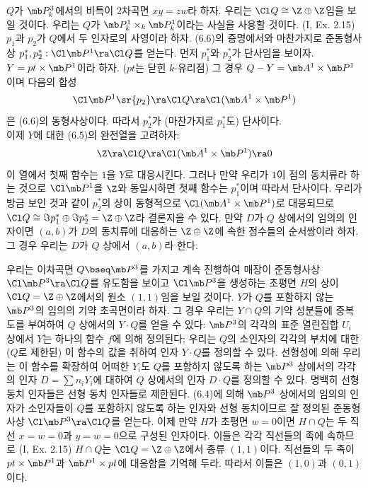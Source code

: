 	
	\begin{example}
	$Q$가 $\mb P^3_k$에서의 비특이 2차곡면 $xy=zw$라 하자. 우리는 $\Cl Q\cong\Z\oplus\Z$임을 보일 것이다.
	우리는 $Q$가 $\mb P_k^1\times_k\mb P_k^1$이라는 사실을 사용할 것이다. (I, Ex. 2.15)
	$p_1$과 $p_2$가 $Q$에서 두 인자로의 사영이라 하자.
	(6.6)의 증명에서와 마찬가지로 준동형사상 $p_1^*,p_2^*:\Cl\mb P^1\ra\Cl Q$를 얻는다.
	먼저 $p_1^*$와 $p_2^*$가 단사임을 보이자. $Y=pt\times\mb P^1$이라 하자. ($pt$는 닫힌 $k$-유리점)
	그 경우 $Q-Y=\mb A^1\times\mb P^1$이며 다음의 합성
	$$\Cl\mb P^1\sr{p_2}\ra\Cl Q\ra\Cl(\mb A^1\times\mb P^1)$$
	은 (6.6)의 동형사상이다. 따라서 $p_2^*$가 (마찬가지로 $p_1^*$도) 단사이다.\\
	이제 $Y$에 대한 (6.5)의 완전열을 고려하자:
	$$\Z\ra\Cl Q\ra\Cl(\mb A^1\times\mb P^1)\ra 0$$
	이 열에서 첫째 함수는 $1$을 $Y$로 대응시킨다.
	그러나 만약 우리가 $1$이 점의 동치류라 하는 것으로 $\Cl\mb P^1$을 $\Z$와 동일시하면 첫째 함수는 $p_1^*$이며 따라서 단사이다.
	우리가 방금 보인 것과 같이 $p_2^*$의 상이 동형적으로 $\Cl(\mb A^1\times\mb P^1)$로 대응되므로
	$\Cl Q\cong\Im p_1^*\oplus\Im p_2^*=\Z\oplus\Z$라 결론지을 수 있다.
	만약 $D$가 $Q$ 상에서의 임의의 인자이면 $(a,b)$가 $D$의 동치류에 대응하는 $\Z\oplus\Z$에 속한 정수들의 순서쌍이라 하자.
	그 경우 우리는 $D$가 $Q$ 상에서  $(a,b)$라 한다.
	\end{example}
	
	
	\begin{example}
	우리는 이차곡면 $Q\bseq\mb P^3$를 가지고 계속 진행하여 매장이 준동형사상 $\Cl\mb P^3\ra\Cl Q$를 유도함을 보이고
	$\Cl\mb P^3$을 생성하는 초평면 $H$의 상이 $\Cl Q=\Z\oplus\Z$에서의 원소 $(1,1)$임을 보일 것이다.
	$Y$가 $Q$를 포함하지 않는 $\mb P^3$의 임의의 기약 초곡면이라 하자.
	그 경우 우리는 $Y\cap Q$의 기약 성분들에 중복도를 부여하여 $Q$ 상에서의  $Y\cdot Q$를 얻을 수 있다:
	$\mb P^3$의 각각의 표준 열린집합 $U_i$ 상에서 $Y$는 하나의 함수 $f$에 의해 정의된다;
	우리는 $Q$의 소인자의 각각의 부치에 대한 ($Q$로 제한된) 이 함수의 값을 취하여 인자 $Y\cdot Q$를 정의할 수 있다.
	선형성에 의해 우리는 이 함수를 확장하여 어떠한 $Y_i$도 $Q$를 포함하지 않도록 하는 $\mb P^3$ 상에서의 각각의 인자
	$D=\sum n_iY_i$에 대하여 $Q$ 상에서의 인자 $D\cdot Q$를 정의할 수 있다.
	명백히 선형 동치 인자들은 선형 동치 인자들로 제한된다.
	(6.4)에 의해 $\mb P^3$ 상에서의 임의의 인자가 소인자들이 $Q$를 포함하지 않도록 하는 인자와 선형 동치이므로
	잘 정의된 준동형사상 $\Cl\mb P^3\ra\Cl Q$를 얻는다.
	이제 만약 $H$가 초평면 $w=0$이면 $H\cap Q$는 두 직선 $x=w=0$과 $y=w=0$으로 구성된 인자이다.
	이들은 각각 직선들의 족에 속하므로 (I, Ex. 2.15) $H\cap Q$는 $\Cl Q=\Z\oplus\Z$에서 종류 $(1,1)$이다.
	직선들의 두 족이 $pt\times\mb P^1$과 $\mb P^1\times pt$에 대응함을 기억해 두라.
	따라서 이들은 $(1,0)$과 $(0,1)$이다.
	\end{example}
	
